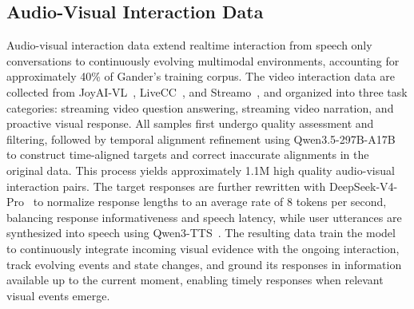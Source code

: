 \subsection{Audio-Visual Interaction Data}
Audio-visual interaction data extend realtime interaction from speech only conversations to continuously evolving multimodal environments, accounting for approximately 40\% of Gander's training corpus. 
The video interaction data are collected from JoyAI-VL~\cite{yao2026joyai}, LiveCC~\cite{chen2025live}, and Streamo~\cite{xia2026streaming}, and organized into three task categories: streaming video question answering, streaming video narration, and proactive visual response. All samples first undergo quality assessment and filtering, followed by temporal alignment refinement using Qwen3.5-297B-A17B~\cite{qwen3_5} to construct time-aligned targets and correct inaccurate alignments in the original data. This process yields approximately 1.1M high quality audio-visual interaction pairs. The target responses are further rewritten with DeepSeek-V4-Pro~\cite{xu2026deepseek} to normalize response lengths to an average rate of 8 tokens per second, balancing response informativeness and speech latency, while user utterances are synthesized into speech using Qwen3-TTS~\cite{hu2026qwen3}. The resulting data train the model to continuously integrate incoming visual evidence with the ongoing interaction, track evolving events and state changes, and ground its responses in information available up to the current moment, enabling timely responses when relevant visual events emerge.







